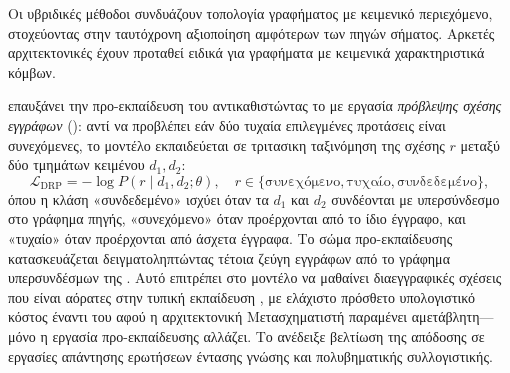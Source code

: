 Οι υβριδικές μέθοδοι συνδυάζουν τοπολογία γραφήματος με κειμενικό περιεχόμενο, στοχεύοντας
στην ταυτόχρονη αξιοποίηση αμφότερων των πηγών σήματος.
Αρκετές αρχιτεκτονικές έχουν
προταθεί ειδικά για γραφήματα με κειμενικά χαρακτηριστικά κόμβων.

\textbf{} \cite{yasunaga2022linkbert} επαυξάνει την προ-εκπαίδευση του 
αντικαθιστώντας το  με εργασία \textit{πρόβλεψης σχέσης εγγράφων} (): αντί να
προβλέπει εάν δύο τυχαία επιλεγμένες προτάσεις είναι συνεχόμενες, το μοντέλο
εκπαιδεύεται σε τριτασικη ταξινόμηση της σχέσης $r$ μεταξύ δύο τμημάτων κειμένου
$d_1, d_2$:
\begin{equation}
    \mathcal{L}_{\mathrm{DRP}} = -\log P(r \mid d_1, d_2; \theta), \quad
    r \in \{\text{συνεχόμενο}, \text{τυχαίο}, \text{συνδεδεμένο}\},
    \label{eq:linkbert-drp}
\end{equation}
όπου η κλάση «συνδεδεμένο» ισχύει όταν τα $d_1$ και $d_2$ συνδέονται με
υπερσύνδεσμο στο γράφημα πηγής, «συνεχόμενο» όταν προέρχονται από το ίδιο έγγραφο,
και «τυχαίο» όταν προέρχονται από άσχετα έγγραφα.
Το σώμα
προ-εκπαίδευσης κατασκευάζεται δειγματοληπτώντας τέτοια ζεύγη εγγράφων από το γράφημα
υπερσυνδέσμων της .
Αυτό επιτρέπει στο μοντέλο να μαθαίνει
διαεγγραφικές σχέσεις που είναι αόρατες στην τυπική εκπαίδευση , με ελάχιστο
πρόσθετο υπολογιστικό κόστος έναντι του  αφού η αρχιτεκτονική Μετασχηματιστή
παραμένει αμετάβλητη---μόνο η εργασία προ-εκπαίδευσης αλλάζει.
Το 
ανέδειξε βελτίωση της απόδοσης σε εργασίες απάντησης ερωτήσεων έντασης γνώσης και
πολυβηματικής συλλογιστικής.

